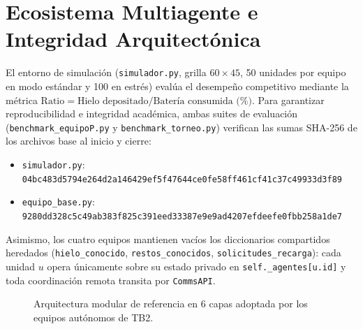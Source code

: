 \documentclass[10pt,a4paper]{article}
\begin{document}
\section{Ecosistema Multiagente e Integridad Arquitectónica}
El entorno de simulación (\texttt{simulador.py}, grilla $60\times 45$, 50 unidades por equipo en modo estándar y 100 en estrés) evalúa el desempeño competitivo mediante la métrica $\text{Ratio} = \text{Hielo depositado} / \text{Batería consumida (\%)}$. Para garantizar reproducibilidad e integridad académica, ambas suites de evaluación (\texttt{benchmark\_equipoP.py} y \texttt{benchmark\_torneo.py}) verifican las sumas SHA-256 de los archivos base al inicio y cierre:
\begin{itemize}
  \item \texttt{simulador.py}: \texttt{04bc483d5794e264d2a146429ef5f47644ce0fe58ff461cf41c37c49933d3f89}
  \item \texttt{equipo\_base.py}: \texttt{9280dd328c5c49ab383f825c391eed33387e9e9ad4207efdeefe0fbb258a1de7}
\end{itemize}
Asimismo, los cuatro equipos mantienen vacíos los diccionarios compartidos heredados (\texttt{hielo\_conocido}, \texttt{restos\_conocidos}, \texttt{solicitudes\_recarga}): cada unidad $u$ opera únicamente sobre su estado privado en \texttt{self.\_agentes[u.id]} y toda coordinación remota transita por \texttt{CommsAPI}.

\begin{figure}[H]
\centering
{}
\caption{Arquitectura modular de referencia en 6 capas adoptada por los equipos autónomos de TB2.}
\end{figure}
\end{document}

